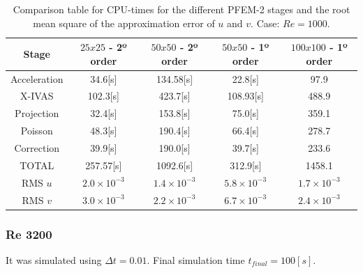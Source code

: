 \documentclass[a4paper,conference]{IEEEtran}
\begin{document}
\begin{table}[htbp]
\begin{center}
{\footnotesize
\begin{tabular}[h]{||c|c|c|c|c||}
    \hline
      Stage & $25x25$ - 2º order & $50x50$  - 2º order & $50x50$ - 1º order & $100x100$ - 1º order\\
      \hline
      \hline
	Acceleration & 34.6[s]& 134.58[s]& 22.8[s] & 97.9\\
	X-IVAS & 102.3[s]& 423.7[s]& 108.93[s] & 488.9 \\
	Projection & 32.4[s]& 153.8[s]& 75.0[s] & 359.1\\
	Poisson & 48.3[s]& 190.4[s]& 66.4[s] & 278.7\\
	Correction & 39.9[s]& 190.0[s]& 39.7[s] & 233.6\\
      \hline
	TOTAL & 257.57[s]& 1092.6[s]& 312.9[s] & 1458.1\\
      \hline
      \hline
	RMS $u$ & $2.0\times10^{-3}$ & $1.4\times10^{-3}$ & $5.8\times10^{-3}$ & $1.7\times10^{-3}$ \\
	RMS $v$ & $3.0\times10^{-3}$ & $2.2\times10^{-3}$ & $6.7\times10^{-3}$ & $2.4\times10^{-3}$ \\
      \hline
      \hline
\end{tabular}
}
\caption{\label{Tabla:times_Re_1000} Comparison table for CPU-times for the different PFEM-2 stages and the root mean square of the approximation error of $u$ and $v$. Case: $Re=1000$.}
\end{center}
\end{table}

\newpage

\subsubsection{Re 3200}


It was simulated using $\Delta t = 0.01$. Final simulation time $t_{final} = 100[s]$.
\end{document}
